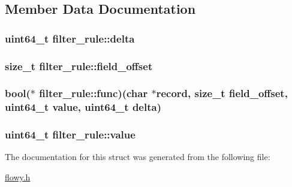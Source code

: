 \subsection{\-Member \-Data \-Documentation}
\hypertarget{structfilter__rule_aa60920ee7afd35534481a141508e9a76}{
\subsubsection[{delta}]{\setlength{\rightskip}{0pt plus 5cm}uint64\-\_\-t {\bf filter\-\_\-rule\-::delta}}}\label{structfilter__rule_aa60920ee7afd35534481a141508e9a76}
\hypertarget{structfilter__rule_ae808db59ea5ef6037127ab92eec860bc}{
\subsubsection[{field\-\_\-offset}]{\setlength{\rightskip}{0pt plus 5cm}size\-\_\-t {\bf filter\-\_\-rule\-::field\-\_\-offset}}}\label{structfilter__rule_ae808db59ea5ef6037127ab92eec860bc}
\hypertarget{structfilter__rule_a3ce3f038c9e169a6940e6aff45759b34}{
\subsubsection[{func}]{\setlength{\rightskip}{0pt plus 5cm}bool($\ast$ {\bf filter\-\_\-rule\-::func})(char $\ast$record, size\-\_\-t {\bf field\-\_\-offset}, uint64\-\_\-t {\bf value}, uint64\-\_\-t {\bf delta})}}\label{structfilter__rule_a3ce3f038c9e169a6940e6aff45759b34}
\hypertarget{structfilter__rule_a58fec5582954b48c67bd0b91113581cc}{
\subsubsection[{value}]{\setlength{\rightskip}{0pt plus 5cm}uint64\-\_\-t {\bf filter\-\_\-rule\-::value}}}\label{structfilter__rule_a58fec5582954b48c67bd0b91113581cc}


\-The documentation for this struct was generated from the following file\-:\begin{DoxyCompactItemize}
\item 
\hyperlink{flowy_8h}{flowy.\-h}\end{DoxyCompactItemize}
